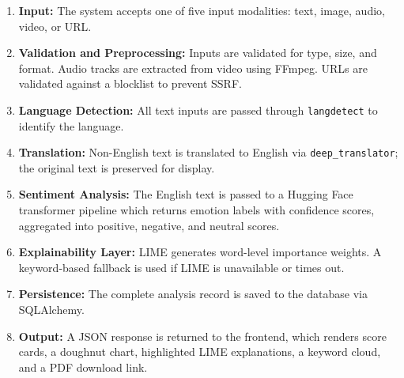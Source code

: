 \documentclass[12pt, a4paper]{report}
\begin{document}
\begin{enumerate}[noitemsep, leftmargin=2em]
    \item \textbf{Input:} The system accepts one of five input modalities: text, image, audio, video, or URL.
    \item \textbf{Validation and Preprocessing:} Inputs are validated for type, size, and format. Audio tracks are extracted from video using FFmpeg. URLs are validated against a blocklist to prevent SSRF.
    \item \textbf{Language Detection:} All text inputs are passed through \texttt{langdetect} to identify the language.
    \item \textbf{Translation:} Non-English text is translated to English via \texttt{deep\_translator}; the original text is preserved for display.
    \item \textbf{Sentiment Analysis:} The English text is passed to a Hugging Face transformer pipeline which returns emotion labels with confidence scores, aggregated into positive, negative, and neutral scores.
    \item \textbf{Explainability Layer:} LIME generates word-level importance weights. A keyword-based fallback is used if LIME is unavailable or times out.
    \item \textbf{Persistence:} The complete analysis record is saved to the database via SQLAlchemy.
    \item \textbf{Output:} A JSON response is returned to the frontend, which renders score cards, a doughnut chart, highlighted LIME explanations, a keyword cloud, and a PDF download link.
\end{enumerate}
\end{document}
